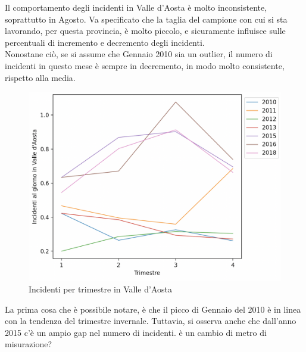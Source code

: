 \documentclass[a4paper]{report}
\begin{document}
Il comportamento degli incidenti in Valle d'Aosta è molto inconsistente, soprattutto in Agosto.
Va specificato che la taglia del campione con cui si sta lavorando, per questa provincia, 
è molto piccolo, e sicuramente influisce sulle percentuali di incremento e decremento 
degli incidenti.\\
Nonostane ciò, se si assume che Gennaio 2010 sia un outlier, il numero di incidenti in 
questo mese è sempre in decremento, in modo molto consistente, rispetto alla media.

\begin{figure}
    \includegraphics[width=\linewidth]{../src/incidenti/incidenti_senza_coords/mese_incidenti/aosta_timestre.png}
    \caption{Incidenti per trimestre in Valle d'Aosta}
    \label{fig:aosta_trimestre}
\end{figure}

La prima cosa che è possibile notare, è che il picco di Gennaio del 2010 è 
in linea con la tendenza del trimestre invernale. 
Tuttavia, si osserva anche che dall'anno 2015 c'è un ampio gap nel numero di 
incidenti. 
è un cambio di metro di misurazione? 
\end{document}
